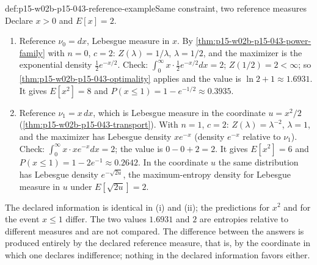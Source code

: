 \begin{hbexample}{def:p15-w02b-p15-043-reference-example}{Same constraint, two reference measures}
Declare \(x>0\) and \(E[x]=2\).
\begin{enumerate}
\item[(i)] Reference \(\nu_0=dx\), Lebesgue measure in \(x\). By
\cref{thm:p15-w02b-p15-043-power-family} with \(n=0\), \(c=2\):
\(Z(\lambda)=1/\lambda\), \(\lambda=1/2\), and the maximizer is the exponential
density \(\tfrac12e^{-x/2}\). Check: \(\int_0^\infty x\cdot\tfrac12e^{-x/2}dx=2\);
\(Z(1/2)=2<\infty\); so \cref{thm:p15-w02b-p15-043-optimality} applies and the
value is \(\ln2+1\approx1.6931\). It gives \(E[x^2]=8\) and
\(P(x\leq1)=1-e^{-1/2}\approx0.3935\).
\item[(ii)] Reference \(\nu_1=x\,dx\), which is Lebesgue measure in the coordinate
\(u=x^2/2\) (\cref{thm:p15-w02b-p15-043-transport}). With \(n=1\), \(c=2\):
\(Z(\lambda)=\lambda^{-2}\), \(\lambda=1\), and the maximizer has Lebesgue density
\(xe^{-x}\) (density \(e^{-x}\) relative to \(\nu_1\)). Check:
\(\int_0^\infty x\cdot xe^{-x}dx=2\); the value is \(0-0+2=2\). It gives
\(E[x^2]=6\) and \(P(x\leq1)=1-2e^{-1}\approx0.2642\). In the coordinate \(u\)
the same distribution has Lebesgue density \(e^{-\sqrt{2u}}\), the
maximum-entropy density for Lebesgue measure in \(u\) under
\(E[\sqrt{2u}]=2\).
\end{enumerate}
The declared information is identical in (i) and (ii); the predictions for
\(x^2\) and for the event \(x\leq1\) differ. The two values \(1.6931\) and
\(2\) are entropies relative to different measures and are not compared. The
difference between the answers is produced entirely by the declared reference
measure, that is, by the coordinate in which one declares indifference; nothing
in the declared information favors either.
\end{hbexample}

